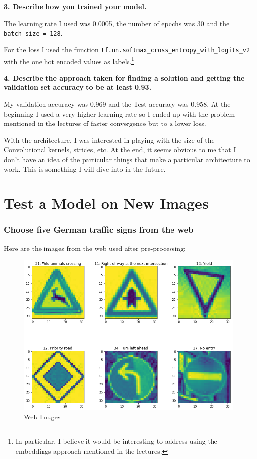 \documentclass[11pt, a4paper]{article}
\begin{document}
\textbf{3. Describe how you trained your model.}

The learning rate I used was 0.0005, the number of epochs was 30 and the \texttt{batch\_size = 128}. 


For the loss I used the function \texttt{tf.nn.softmax\_cross\_entropy\_with\_logits\_v2} with the one hot encoded values as labels.\footnote{In particular, I believe it would be interesting to address using the embeddings approach mentioned in the lectures.}



\textbf{4. Describe the approach taken for finding a solution and getting the validation set accuracy to be at least 0.93.}


My validation accuracy was 0.969 and the Test accuracy was 0.958. At the beginning I used a very higher learning rate so I ended up with the problem mentioned in the lectures of faster convergence but to a lower loss. 

With the architecture, I was interested in playing with the size of the Convolutional kernels, strides, etc. At the end, it seems obvious to me that I don't have an idea of the particular things that make a particular architecture to work. This is something I will dive into in the future. 




\section{Test a Model on New Images}%
\label{sec:test_a_model_on_new_images}

\subsubsection{Choose five German traffic signs from the web}%
\label{ssub:choose_five_german_traffic_signs_from_the_web}

Here are the images from the web used after pre-processing:
\begin{figure}[htpb]
	\centering
	\includegraphics[width=0.8\linewidth]{web_images}
	\caption{Web Images}
	\label{fig:web_images}
\end{figure}
\end{document}
